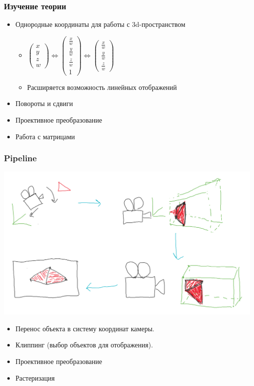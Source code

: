 \documentclass{beamer}
\begin{document}
\begin{frame}

\frametitle{Изучение теории}

\begin{itemize}

\item Однородные координаты для работы с 3d-пространством
\begin{itemize}
\item $\begin{pmatrix} x \\ y \\ z \\ w \end{pmatrix} \iff \begin{pmatrix} \frac{x}{w} \\ \frac{y}{w} \\ \frac{z}{w} \\ 1 \end{pmatrix} \iff \begin{pmatrix} \frac{x}{w} \\ \frac{y}{w} \\ \frac{z}{w} \end{pmatrix}$
\item Расширяется возможность линейных отображений
\end{itemize}
\item Повороты и сдвиги
\item Проективное преобразование
\item Работа с матрицами

\end{itemize}


\end{frame}

\begin{frame}
\frametitle{Pipeline}

\begin{center}
\includegraphics[width=0.6 \linewidth]{presentation_pipeline.png}
\end{center}
\begin{itemize}
\item Перенос объекта в систему координат камеры.
\item Клиппинг (выбор объектов для отображения).
\item Проективное преобразование
\item Растеризация
\end{itemize}

\end{frame}
\end{document}
